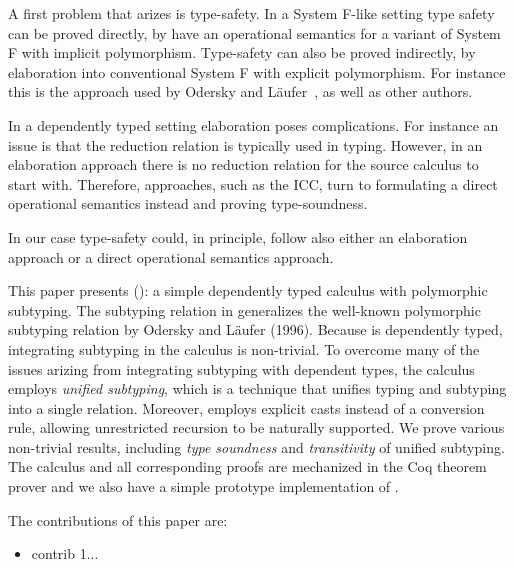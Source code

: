 A first problem that arizes is type-safety. 
In a System F-like setting type safety can be proved 
directly, by have an operational semantics for
a variant of System F with implicit polymorphism.
Type-safety can also be proved indirectly, by elaboration
into conventional System F with explicit polymorphism.
For instance this is the approach used by Odersky and L\"aufer~\cite{},
as well as other authors.

In a dependently typed setting elaboration poses
complications. For instance an issue is that the reduction
relation is typically used in typing. However, in an elaboration
approach there is no reduction relation for the source calculus
to start with. Therefore, approaches, such as the ICC, turn to
formulating a direct operational semantics instead and proving
type-soundness. 

In our case type-safety could, in principle, follow also either an elaboration
approach or a direct operational semantics approach. 

This paper presents \system (\name): a simple dependently typed
calculus with polymorphic subtyping. The subtyping relation in \name
generalizes the well-known polymorphic subtyping relation by Odersky
and L\"aufer (1996). Because \name is dependently typed, integrating
subtyping in the calculus is non-trivial. To overcome many of the
issues arizing from integrating subtyping with dependent types, the
calculus employs \emph{unified subtyping}, which is a technique that
unifies typing and subtyping into a single relation. Moreover, \name
employs explicit casts instead of a conversion rule, allowing
unrestricted recursion to be naturally supported.  We prove various
non-trivial results, including \emph{type soundness} and
\emph{transitivity} of unified subtyping. The calculus and all
corresponding proofs are mechanized in the Coq theorem prover and we
also have a simple prototype implementation of \name.

The contributions of this paper are:

\begin{itemize}

\item contrib 1...

\end{itemize}
